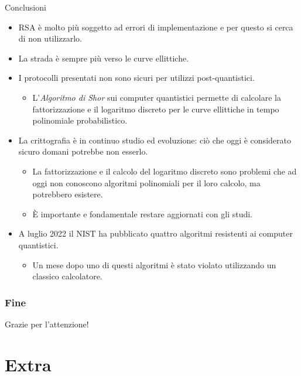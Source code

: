 \documentclass[11pt,svgnames,smaller,aspectratio=169,italian]{beamer}
\newcommand{\extrabegin}{
   \newcounter{finalframe}
   \setcounter{finalframe}{\value{framenumber}}
}
\begin{document}
\begin{frame}{Conclusioni}
	\begin{itemize}
		\item RSA è molto più soggetto ad errori di implementazione e per questo si cerca di non utilizzarlo.
		\item La strada è sempre più verso le curve ellittiche.
		\item I protocolli presentati non sono sicuri per utilizzi post-quantistici.
			\begin{itemize}
				\item L'\emph{Algoritmo di Shor} sui computer quantistici permette di calcolare la fattorizzazione e il logaritmo discreto per le curve ellittiche in tempo polinomiale probabilistico.
			\end{itemize}
		\item La crittografia è in continuo studio ed evoluzione: ciò che oggi è considerato sicuro domani potrebbe non esserlo.
			\begin{itemize}
				\item La fattorizzazione e il calcolo del logaritmo discreto sono problemi che ad oggi non conoscono algoritmi polinomiali per il loro calcolo, ma potrebbero esistere.
				\item È importante e fondamentale restare aggiornati con gli studi.
			\end{itemize}
		\item A luglio 2022 il NIST ha pubblicato quattro algoritmi resistenti ai computer quantistici.
			\begin{itemize}
				\item Un mese dopo uno di questi algoritmi è stato violato utilizzando un classico calcolatore.
			\end{itemize}
	\end{itemize}
\end{frame}

\begin{frame}
		\frametitle{Fine}
		\centering
		\Large
		Grazie per l'attenzione!
\end{frame}

\extrabegin

\section*{Extra}
\begin{frame}
	\sectionpage
	\centering
\end{frame}
\end{document}
